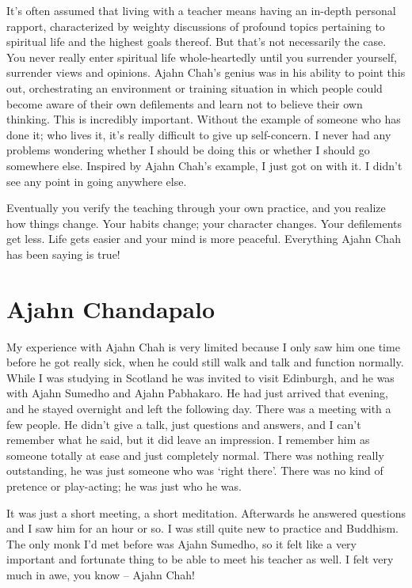 It's often assumed that living with a teacher means having an in-depth
personal rapport, characterized by weighty discussions of profound
topics pertaining to spiritual life and the highest goals thereof. But
that's not necessarily the case. You never really enter spiritual life
whole-heartedly until you surrender yourself, surrender views and
opinions. Ajahn Chah's genius was in his ability to point this out, 
orchestrating an environment or training situation in which people could
become aware of their own defilements and learn not to believe their own
thinking. This is incredibly important. Without the example of someone
who has done it; who lives it, it's really difficult to give up
self-concern. I never had any problems wondering whether I should be
doing this or whether I should go somewhere else. Inspired by Ajahn
Chah's example, I just got on with it. I didn't see any point in going
anywhere else. 

Eventually you verify the teaching through your own practice, and you
realize how things change. Your habits change; your character changes. 
Your defilements get less. Life gets easier and your mind is more
peaceful. Everything Ajahn Chah has been saying is true! 

\section{Ajahn Chandapalo}

My experience with Ajahn Chah is very limited because I only saw him one
time before he got really sick, when he could still walk and talk and
function normally. While I was studying in Scotland he was invited to
visit Edinburgh, and he was with Ajahn Sumedho and Ajahn Pabhakaro. He
had just arrived that evening, and he stayed overnight and left the
following day. There was a meeting with a few people. He didn't give a
talk, just questions and answers, and I can't remember what he said, but
it did leave an impression. I remember him as someone totally at ease
and just completely normal. There was nothing really outstanding, he was
just someone who was `right there'. There was no kind of pretence or
play-acting; he was just who he was. 

It was just a short meeting, a short meditation. Afterwards he answered
questions and I saw him for an hour or so. I was still quite new to
practice and Buddhism. The only monk I'd met before was Ajahn Sumedho, 
so it felt like a very important and fortunate thing to be able to meet
his teacher as well. I felt very much in awe, you know -- Ajahn Chah! 

